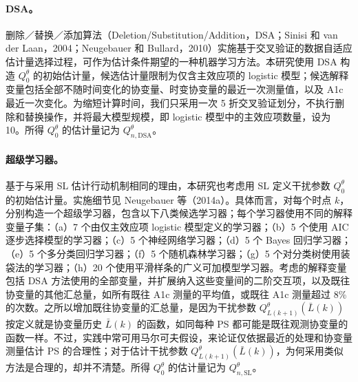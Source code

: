 \paragraph{DSA。}
删除／替换／添加算法（Deletion/Substitution/Addition，DSA；Sinisi 和 van der Laan，2004；Neugebauer 和 Bullard，2010）实施基于交叉验证的数据自适应估计量选择过程，可作为估计条件期望的一种机器学习方法。本研究使用 DSA 构造 $Q_0^\theta$ 的初始估计量，候选估计量限制为仅含主效应项的 logistic 模型；候选解释变量包括全部不随时间变化的协变量、时变协变量的最近一次测量值，以及 A1c 最近一次变化。为缩短计算时间，我们只采用一次 5 折交叉验证划分，不执行删除和替换操作，并将最大模型规模，即 logistic 模型中的主效应项数量，设为 10。所得 $Q_0^\theta$ 的估计量记为 $Q^\theta_{n,\mathrm{DSA}}$。

\paragraph{超级学习器。}
基于与采用 SL 估计行动机制相同的理由，本研究也考虑用 SL 定义干扰参数 $Q_0^\theta$ 的初始估计量。实施细节见 Neugebauer 等（2014a）。具体而言，对每个时点 $k$，分别构造一个超级学习器，包含以下八类候选学习器；每个学习器使用不同的解释变量子集：（a）7 个由仅主效应项 logistic 模型定义的学习器；（b）5 个使用 AIC 逐步选择模型的学习器；（c）5 个神经网络学习器；（d）5 个 Bayes 回归学习器；（e）5 个多分类回归学习器；（f）5 个随机森林学习器；（g）5 个对分类树使用装袋法的学习器；（h）20 个使用平滑样条的广义可加模型学习器。考虑的解释变量包括 DSA 方法使用的全部变量，并扩展纳入这些变量间的二阶交互项，以及既往协变量的其他汇总量，如所有既往 A1c 测量的平均值，或既往 A1c 测量超过 8\% 的次数。之所以增加既往协变量的汇总量，是因为干扰参数 $Q^\theta_{L(k+1)}(\bar L(k))$ 按定义就是协变量历史 $\bar L(k)$ 的函数，如同每种 PS 都可能是既往观测协变量的函数一样。不过，实践中常可用马尔可夫假设，来论证仅依据最近的处理和协变量测量估计 PS 的合理性；对于估计干扰参数 $Q^\theta_{L(k+1)}(\bar L(k))$，为何采用类似方法是合理的，却并不清楚。所得 $Q_0^\theta$ 的估计量记为 $Q^\theta_{n,\mathrm{SL}}$。
